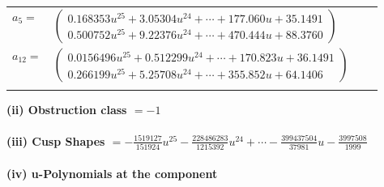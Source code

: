 \documentclass[1p]{elsarticle_modified}
\theoremstyle{definition}
\begin{document}
\begin{tabular}{m{7pt} m{180pt} m{7pt} m{180pt} }
\flushright $a_{5}=$&$\begin{pmatrix}0.168353 u^{25}+3.05304 u^{24}+\cdots+177.060 u+35.1491\\0.500752 u^{25}+9.22376 u^{24}+\cdots+470.444 u+88.3760\end{pmatrix}$ \\
\flushright $a_{12}=$&$\begin{pmatrix}0.0156496 u^{25}+0.512299 u^{24}+\cdots+170.823 u+36.1491\\0.266199 u^{25}+5.25708 u^{24}+\cdots+355.852 u+64.1406\end{pmatrix}$\\&\end{tabular}
\flushleft \textbf{(ii) Obstruction class $= -1$}\\~\\
\flushleft \textbf{(iii) Cusp Shapes $= -\frac{1519127}{151924} u^{25}-\frac{228486283}{1215392} u^{24}+\cdots-\frac{399437504}{37981} u-\frac{3997508}{1999}$}\\~\\
\newpage\renewcommand{\arraystretch}{1}
\flushleft \textbf{(iv) u-Polynomials at the component}\newline \\
\end{document}
